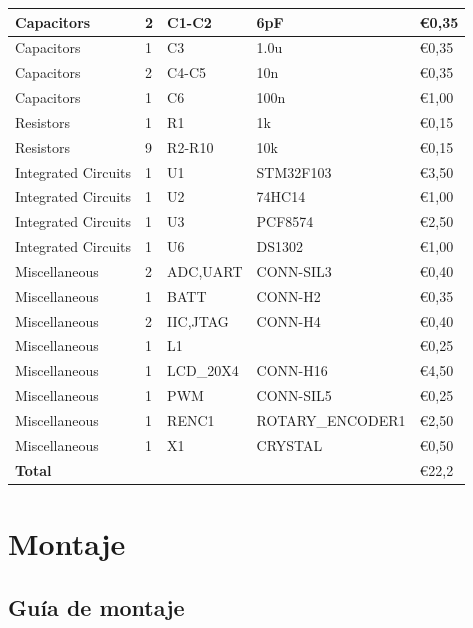 \documentclass[10pt,a4paper,oneside]{article}
\begin{document}
\begin{center}
\begin{longtable}{|l|l|l|l|l|}
\midrule
Capacitors & 2      & C1-C2  & 6pF    & €0,35 \\
\midrule
Capacitors & 1      & C3     & 1.0u   & €0,35 \\
\midrule
Capacitors & 2      & C4-C5  & 10n    & €0,35 \\
\midrule
Capacitors & 1      & C6     & 100n   & €1,00 \\
\midrule
Resistors & 1      & R1     & 1k     & €0,15 \\
\midrule
Resistors & 9      & R2-R10 & 10k    & €0,15 \\
\midrule
Integrated Circuits & 1      & U1     & STM32F103 & €3,50 \\
\midrule
Integrated Circuits & 1      & U2     & 74HC14 & €1,00 \\
\midrule
Integrated Circuits & 1      & U3     & PCF8574 & €2,50 \\
\midrule
Integrated Circuits & 1      & U6     & DS1302 & €1,00 \\
\midrule
Miscellaneous & 2      & ADC,UART & CONN-SIL3 & €0,40 \\
\midrule
Miscellaneous & 1      & BATT   & CONN-H2 & €0,35 \\
\midrule
Miscellaneous & 2      & IIC,JTAG & CONN-H4 & €0,40 \\
\midrule
Miscellaneous & 1      & L1     &        & €0,25 \\
\midrule
Miscellaneous & 1      & LCD\_20X4 & CONN-H16 & €4,50 \\
\midrule
Miscellaneous & 1      & PWM    & CONN-SIL5 & €0,25 \\
\midrule
Miscellaneous & 1      & RENC1  & ROTARY\_ENCODER1 & €2,50 \\
\midrule
Miscellaneous & 1      & X1     & CRYSTAL & €0,50 \\
\midrule
\textbf{Total} &        &        &        & €22,2 \\
\bottomrule

\end{longtable}
\end{center}

\section{Montaje}
\subsection{Guía de montaje}%
\end{document}

